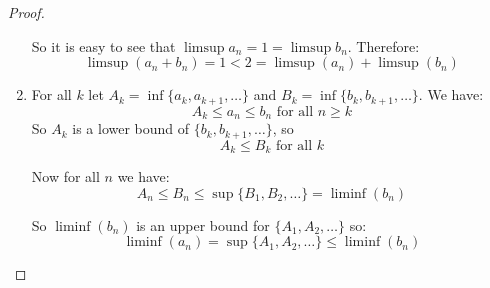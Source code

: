 \begin{exercise}
\begin{proof}
\begin{enumerate}[label = (\alph*)]
                So it is easy to see that $\limsup a_n = 1 = \limsup b_n$. Therefore:\begin{equation*}
                    \limsup (a_n+b_n) = 1 < 2 = \limsup(a_n) + \limsup(b_n)
                \end{equation*}
               \item For all $k$ let $A_k = \inf\{a_k,a_{k+1},\ldots\}$ and $B_k = \inf\{b_k,b_{k+1},\ldots\}$. We have:\begin{equation*}
                    A_k\leq a_n\leq b_n \text{ for all }n\geq k
               \end{equation*}
               So $A_k$ is a lower bound of $\{b_k,b_{k+1},\ldots\}$, so \[A_k\leq B_k \text{ for all }k\]

               Now for all $n$ we have:\begin{equation*}
                    A_n\leq B_n\leq \sup\{B_1,B_2,\ldots\} = \liminf (b_n) 
               \end{equation*}

               So $\liminf(b_n)$ is an upper bound for $\{A_1,A_2,\ldots\}$  so:\[\liminf(a_n) = \sup\{A_1,A_2,\ldots\}\leq \liminf(b_n) \] 
            \end{enumerate}
        \end{proof}
    \end{exercise}

